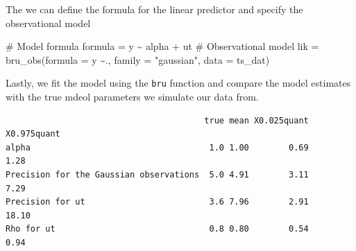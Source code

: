 \documentclass[
  letterpaper,
  DIV=11,
  numbers=noendperiod]{scrartcl}
\newenvironment{Shaded}{\begin{snugshade}}{\end{snugshade}}
\newcommand{\AttributeTok}[1]{\textcolor[rgb]{0.40,0.45,0.13}{#1}}
\newcommand{\CommentTok}[1]{\textcolor[rgb]{0.37,0.37,0.37}{#1}}
\newcommand{\DecValTok}[1]{\textcolor[rgb]{0.68,0.00,0.00}{#1}}
\newcommand{\FunctionTok}[1]{\textcolor[rgb]{0.28,0.35,0.67}{#1}}
\newcommand{\NormalTok}[1]{\textcolor[rgb]{0.00,0.23,0.31}{#1}}
\newcommand{\OtherTok}[1]{\textcolor[rgb]{0.00,0.23,0.31}{#1}}
\newcommand{\SpecialCharTok}[1]{\textcolor[rgb]{0.37,0.37,0.37}{#1}}
\newcommand{\StringTok}[1]{\textcolor[rgb]{0.13,0.47,0.30}{#1}}
\begin{document}
The we can define the formula for the linear predictor and specify the
observational model

\begin{Shaded}
\begin{Highlighting}[]
\CommentTok{\# Model formula}
\NormalTok{formula }\OtherTok{=}\NormalTok{ y }\SpecialCharTok{\textasciitilde{}}\NormalTok{ alpha }\SpecialCharTok{+}\NormalTok{ ut}
\CommentTok{\# Observational model}
\NormalTok{lik }\OtherTok{=}  \FunctionTok{bru\_obs}\NormalTok{(}\AttributeTok{formula =}\NormalTok{ y }\SpecialCharTok{\textasciitilde{}}\NormalTok{.,}
            \AttributeTok{family =} \StringTok{"gaussian"}\NormalTok{,}
            \AttributeTok{data =}\NormalTok{ ts\_dat)}
\end{Highlighting}
\end{Shaded}

Lastly, we fit the model using the \texttt{bru} function and compare the
model estimates with the true mdeol parameters we simulate our data
from.

\begin{Shaded}
\end{Shaded}

\begin{verbatim}
                                        true mean X0.025quant X0.975quant
alpha                                    1.0 1.00        0.69        1.28
Precision for the Gaussian observations  5.0 4.91        3.11        7.29
Precision for ut                         3.6 7.96        2.91       18.10
Rho for ut                               0.8 0.80        0.54        0.94
\end{verbatim}
\end{document}
